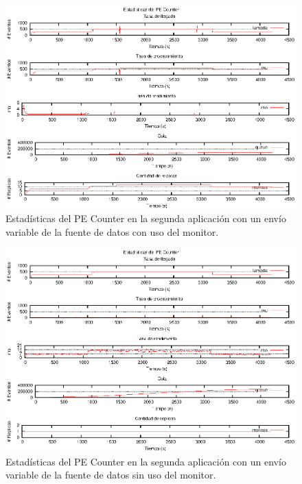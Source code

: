 \begin{figure}[p]
\centering
    \includegraphics[scale=1.1]{images/exp/app2/normal/cm/statusCounterPE.eps}
    \caption{Estadísticas del PE Counter en la segunda aplicación con un envío variable de la fuente de datos con uso del monitor.}
    \label{fig:app2-normal-statusCounterPE-cm}
\end{figure}

\begin{figure}[p]
\centering
    \includegraphics[scale=1.1]{images/exp/app2/normal/sm/statusCounterPE.eps}
    \caption{Estadísticas del PE Counter en la segunda aplicación con un envío variable de la fuente de datos sin uso del monitor.}
    \label{fig:app2-normal-statusCounterPE-sm}
\end{figure}

